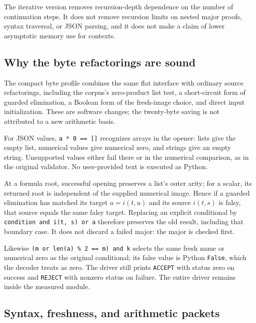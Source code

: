 \documentclass[11pt,letterpaper]{article}
\theoremstyle{definition}\newtheorem{definition}[theorem]{Definition}
\theoremstyle{remark}\newtheorem{remark}[theorem]{Remark}
\newcommand{\file}[1]{{\small\nolinkurl{#1}}}
\begin{document}
The iterative version removes recursion-depth dependence on the
number of continuation steps. It does not remove recursion limits
on nested major proofs, syntax traversal, or JSON parsing, and it
does not make a claim of lower asymptotic memory use for contexts.

\subsection{Why the byte refactorings are sound}

The compact byte profile combines the same flat interface with
ordinary source refactorings, including the corpus's zero-product
list test, a short-circuit form of guarded elimination, a Boolean
form of the fresh-image choice, and direct input initialization.
These are software changes; the twenty-byte saving is not attributed
to a new arithmetic basis.

For JSON values, \file{a * 0 == []} recognizes arrays in the opener:
lists give the empty list, numerical values give numerical zero,
and strings give an empty string. Unsupported values either fail
there or in the numerical comparison, as in the original validator.
No user-provided text is executed as Python.

At a formula root, successful opening preserves a list's outer arity;
for a scalar, its returned root is independent of the supplied
numerical image. Hence if a guarded elimination has matched its
target $a=i(t,u)$ and its source $i(t,s)$ is falsy, that source
equals the same falsy target. Replacing an explicit conditional by
\file{condition and i(t, s) or a} therefore preserves the old result,
including that boundary case. It does not discard a failed major:
the major is checked first.

Likewise \file{(m or len(a) \% 2 == m) and k} selects the same
fresh name or numerical zero as the original conditional; its false
value is Python \file{False}, which the decoder treats as zero.
The driver still prints \file{ACCEPT} with status zero on success
and \file{REJECT} with nonzero status on failure. The entire
driver remains inside the measured module.

\subsection{Syntax, freshness, and arithmetic packets}
\end{document}

